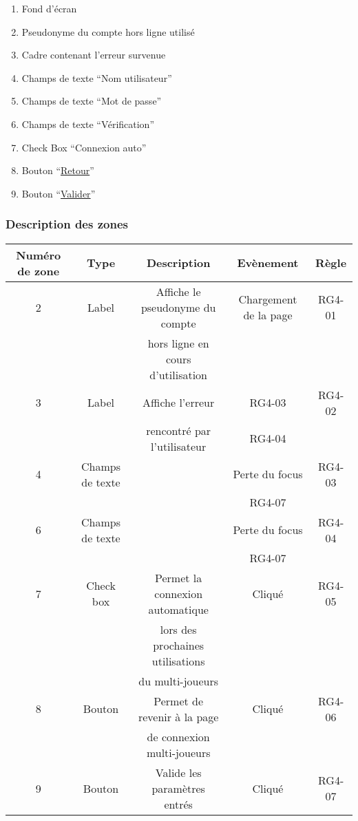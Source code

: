 \documentclass{report}
\begin{document}
		\hypertarget{Creation compte multi-joueurs}{}
		\label{Creation compte multi-joueurs}
	
		\begin{center}
			
		\end{center}
		
		\begin{enumerate}
		  \item Fond d'écran
		  \item Pseudonyme du compte hors ligne utilisé
		  \item Cadre contenant l'erreur survenue
		  \item Champs de texte ``Nom utilisateur''
		  \item Champs de texte ``Mot de passe''
		  \item Champs de texte ``Vérification''
		  \item Check Box ``Connexion auto''
		  \item Bouton ``\hyperlink{Connexion multi-joueurs}{Retour}''
		  \item Bouton ``\hyperlink{Accueil multi-joueurs}{Valider}''
		\end{enumerate}
		
		\subsubsection{Description des zones}
		
			\begin{tabular}{|c|c|c|c|c|} \hline
				Numéro de zone & Type  & Description & Evènement &	Règle \\\hline
				2 & Label & Affiche le pseudonyme du compte & Chargement de la page & RG4-01 \\
				  &       & hors ligne en cours d'utilisation & & \\\hline
				3 & Label & Affiche l'erreur & RG4-03 & RG4-02 \\
				  &       & rencontré par l'utilisateur & RG4-04 & \\\hline
				4 & Champs de texte & & Perte du focus & RG4-03 \\
				 & & & RG4-07 & \\\hline 
				6 & Champs de texte & & Perte du focus & RG4-04 \\
				 & & & RG4-07 & \\\hline 
				7 & Check box & Permet la connexion automatique & Cliqué & RG4-05 \\
				  &           & lors des prochaines utilisations&        & \\				
				  &           & du multi-joueurs                &        & \\\hline
				8 & Bouton & Permet de revenir à la page & Cliqué & RG4-06 \\
				  &        & de connexion multi-joueurs \footnotemark[1] & & \\\hline
				9 & Bouton & Valide les paramètres entrés & Cliqué & RG4-07 \\\hline
			\end{tabular}
			
\end{document}
